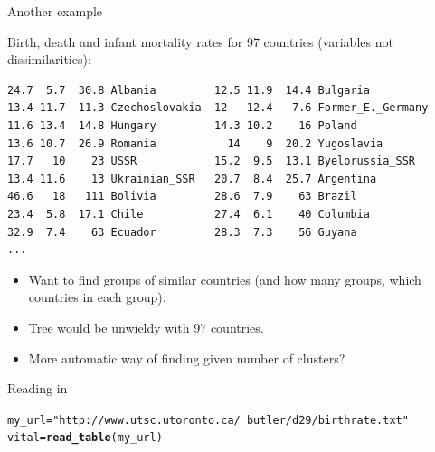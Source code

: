 \documentclass[unknownkeysallowed]{beamer}\usepackage[]{graphicx}\usepackage[]{color}
\makeatletter
\newcommand{\hlstr}[1]{\textcolor[rgb]{0.192,0.494,0.8}{#1}}%
\newcommand{\hlstd}[1]{\textcolor[rgb]{0.345,0.345,0.345}{#1}}%
\newcommand{\hlkwb}[1]{\textcolor[rgb]{0.69,0.353,0.396}{#1}}%
\newcommand{\hlkwd}[1]{\textcolor[rgb]{0.737,0.353,0.396}{\textbf{#1}}}%
\newenvironment{kframe}{%
 \def\at@end@of@kframe{}%
 \ifinner\ifhmode%
  \def\at@end@of@kframe{\end{minipage}}%
  \begin{minipage}{\columnwidth}%
 \fi\fi%
 \def\FrameCommand##1{\hskip\@totalleftmargin \hskip-\fboxsep
 \colorbox{shadecolor}{##1}\hskip-\fboxsep
     \hskip-\linewidth \hskip-\@totalleftmargin \hskip\columnwidth}%
 \MakeFramed {\advance\hsize-\width
   \@totalleftmargin\z@ \linewidth\hsize
   \@setminipage}}%
 {\par\unskip\endMakeFramed%
 \at@end@of@kframe}
\newenvironment{knitrout}{}{} %
\makeatother
\begin{document}
\begin{frame}[fragile]{Another example}

Birth, death and infant mortality rates for 97 countries (variables not dissimilarities):

{\scriptsize
\begin{verbatim}
24.7  5.7  30.8 Albania         12.5 11.9  14.4 Bulgaria
13.4 11.7  11.3 Czechoslovakia  12   12.4   7.6 Former_E._Germany
11.6 13.4  14.8 Hungary         14.3 10.2    16 Poland
13.6 10.7  26.9 Romania           14    9  20.2 Yugoslavia
17.7   10    23 USSR            15.2  9.5  13.1 Byelorussia_SSR
13.4 11.6    13 Ukrainian_SSR   20.7  8.4  25.7 Argentina
46.6   18   111 Bolivia         28.6  7.9    63 Brazil
23.4  5.8  17.1 Chile           27.4  6.1    40 Columbia
32.9  7.4    63 Ecuador         28.3  7.3    56 Guyana
...
\end{verbatim}
}

\begin{itemize}
\item Want to find groups of similar countries (and how many groups, which countries in each group).
\item Tree would be unwieldy with 97 countries.
\item More automatic way of finding given number of clusters?
\end{itemize}
  
\end{frame}

\begin{frame}[fragile]{Reading in}

  
\begin{knitrout}
\color{fgcolor}\begin{kframe}
\begin{alltt}
\hlstd{my_url}\hlkwb{=}\hlstr{"http://www.utsc.utoronto.ca/~butler/d29/birthrate.txt"}
\hlstd{vital}\hlkwb{=}\hlkwd{read_table}\hlstd{(my_url)}
\end{alltt}


{\ttfamily\noindent\itshape\color{messagecolor}{\#\# Parsed with column specification:\\\#\# cols(\\\#\#\ \  birth = col\_double(),\\\#\#\ \  death = col\_double(),\\\#\#\ \  infant = col\_double(),\\\#\#\ \  country = col\_character()\\\#\# )}}\end{kframe}
\end{knitrout}

\end{frame}
\end{document}
